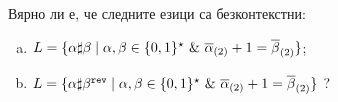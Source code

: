 \begin{extra}
\begin{problem}
  Вярно ли е, че следните езици са безконтекстни:
  \begin{enumerate}[a)]
  \item 
    $L = \{\alpha\sharp\beta \mid \alpha,\beta \in \{0,1\}^\star\ \&\ \overline{\alpha}_{(2)} + 1 = \overline{\beta}_{(2)} \}$;
  \item
    $L = \{\alpha\sharp\beta^{\texttt{rev}} \mid \alpha,\beta \in \{0,1\}^\star\ \&\ \overline{\alpha}_{(2)} + 1 = \overline{\beta}_{(2)} \}$ ?
  \end{enumerate}
\end{problem}

\end{extra}


